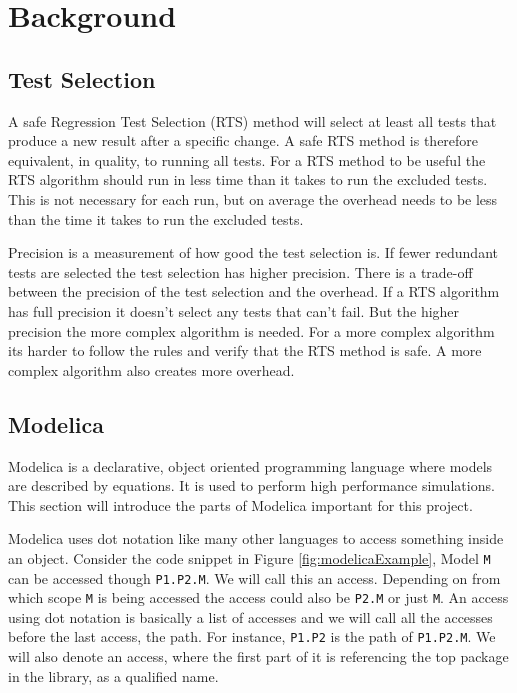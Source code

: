 \documentclass{cslthse-msc}
\begin{document}
\chapter[Background]{Background}
\section{Test Selection}
A safe Regression Test Selection (RTS) method will select at least all tests that produce a new result after a specific change. \cite{DBLP:conf/pppj/OqvistHM16} A safe RTS method is therefore equivalent, in quality, to running all tests. For a RTS method to be useful the RTS algorithm should run in less time than it takes to run the excluded tests. This is not necessary for each run, but on average the overhead needs to be less than the time it takes to run the excluded tests.

Precision is a measurement of how good the test selection is. \cite{DBLP:conf/sigsoft/LegunsenHSLZM16} If fewer redundant tests are selected the test selection has higher precision. There is a trade-off between the precision of the test selection and the overhead. If a RTS algorithm has full precision it doesn't select any tests that can't fail. But the higher precision the more complex algorithm is needed. For a more complex algorithm its harder to follow the rules and verify that the RTS method is safe. A more complex algorithm also creates more overhead.

\section{Modelica}
Modelica is a declarative, object oriented programming language where models are described by equations. It is used to perform high performance simulations. This section will introduce the parts of Modelica important for this project.

Modelica uses dot notation like many other languages to access something inside an object. Consider the code snippet in Figure \ref{fig:modelicaExample}, Model \texttt{M} can be accessed though \texttt{P1.P2.M}. We will call this an access. Depending on from which scope \texttt{M} is being accessed the access could also be \texttt{P2.M} or just \texttt{M}. An access using dot notation is basically a list of accesses and we will call all the accesses before the last access, the path. For instance, \texttt{P1.P2} is the path of \texttt{P1.P2.M}. We will also denote an access, where the first part of it is referencing the top package in the library, as a qualified name.
\end{document}
